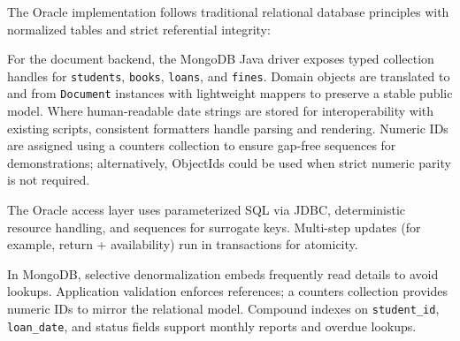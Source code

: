 \documentclass[12pt,a4paper]{article}
\begin{document}
The Oracle implementation follows traditional relational database principles with normalized tables and strict referential integrity:
\begin{comment}
\begin{lstlisting}[language=SQL, caption=Oracle Database Schema]
-- Students table with constraints
CREATE TABLE Students (
    student_id NUMBER PRIMARY KEY,
    name VARCHAR2(100) NOT NULL,
    email VARCHAR2(100) UNIQUE NOT NULL,
    phone VARCHAR2(20),
    address VARCHAR2(200),
    registration_date DATE DEFAULT SYSDATE
);

-- Books table with data validation
CREATE TABLE Books (
    book_id NUMBER PRIMARY KEY,
    title VARCHAR2(200) NOT NULL,
    author VARCHAR2(100) NOT NULL,
    isbn VARCHAR2(20) UNIQUE,
    category VARCHAR2(50),
    publication_year NUMBER(4),
    available_copies NUMBER DEFAULT 0,
    total_copies NUMBER DEFAULT 0
);

-- Loans table with foreign key constraints ensuring referential integrity
CREATE TABLE Loans (
    loan_id NUMBER PRIMARY KEY,
    student_id NUMBER NOT NULL,
    book_id NUMBER NOT NULL,
    loan_date DATE DEFAULT SYSDATE,
    due_date DATE NOT NULL,
    return_date DATE,
    status VARCHAR2(20) DEFAULT 'ACTIVE',
    renewal_count NUMBER DEFAULT 0,
    CONSTRAINT fk_loan_student FOREIGN KEY (student_id) REFERENCES Students(student_id),
    CONSTRAINT fk_loan_book FOREIGN KEY (book_id) REFERENCES Books(book_id)
);
\end{lstlisting}
\end{comment}

For the document backend, the MongoDB Java driver exposes typed collection handles for \texttt{students}, \texttt{books}, \texttt{loans}, and \texttt{fines}. Domain objects are translated to and from \texttt{Document} instances with lightweight mappers to preserve a stable public model. Where human-readable date strings are stored for interoperability with existing scripts, consistent formatters handle parsing and rendering. Numeric IDs are assigned using a counters collection to ensure gap-free sequences for demonstrations; alternatively, ObjectIds could be used when strict numeric parity is not required.

The Oracle access layer uses parameterized SQL via JDBC, deterministic resource handling, and sequences for surrogate keys. Multi-step updates (for example, return + availability) run in transactions for atomicity.

In MongoDB, selective denormalization embeds frequently read details to avoid lookups. Application validation enforces references; a counters collection provides numeric IDs to mirror the relational model. Compound indexes on \texttt{student\_id}, \texttt{loan\_date}, and status fields support monthly reports and overdue lookups.
\end{document}
